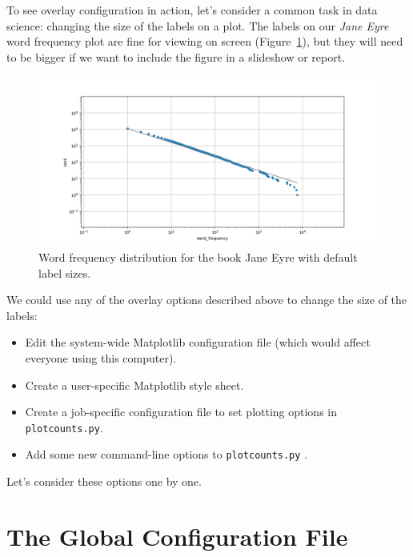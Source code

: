 \documentclass[
]{krantz}
\providecommand{\tightlist}{%
  \setlength{\itemsep}{0pt}\setlength{\parskip}{0pt}}
\begin{document}
To see overlay configuration in action,
let's consider a common task in data science:
changing the size of the labels on a plot.
The labels on our \emph{Jane Eyre} word frequency plot are fine for viewing on screen
(Figure~\ref{fig:configuration-jane-eyre-default}),
but they will need to be bigger
if we want to include the figure in a slideshow or report.

\begin{figure}

{\centering \includegraphics[width=1\linewidth]{figures/config/jane-eyre-default} 

}

\caption{Word frequency distribution for the book Jane Eyre with default label sizes.}\label{fig:configuration-jane-eyre-default}
\end{figure}

We could use any of the overlay options described above
to change the size of the labels:

\begin{itemize}
\tightlist
\item
  Edit the system-wide Matplotlib configuration file
  (which would affect everyone using this computer).
\item
  Create a user-specific Matplotlib style sheet.
\item
  Create a job-specific configuration file to set plotting options in \texttt{plotcounts.py}.
\item
  Add some new command-line options to \texttt{plotcounts.py} .
\end{itemize}

Let's consider these options one by one.

\hypertarget{config-global}{%
\section{The Global Configuration File}\label{config-global}}
\end{document}
